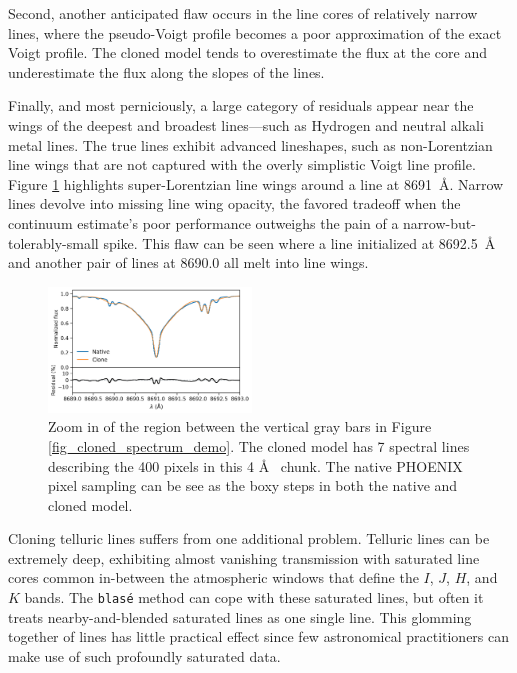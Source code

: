 \documentclass[twocolumn]{aastex631}
\begin{document}
Second, another anticipated flaw occurs in the line cores of relatively narrow lines, where the pseudo-Voigt profile becomes a poor approximation of the exact Voigt profile.  The cloned model tends to overestimate the flux at the core and underestimate the flux along the slopes of the lines.

Finally, and most perniciously, a large category of residuals appear near the wings of the deepest and broadest lines---such as Hydrogen and neutral alkali metal lines.  The true lines exhibit advanced lineshapes, such as non-Lorentzian line wings that are not captured with the overly simplistic Voigt line profile.  Figure \ref{fig_zoom_cloning_performance} highlights super-Lorentzian line wings around a line at 8691~\AA.  Narrow lines devolve into missing line wing opacity, the favored tradeoff when the continuum estimate's poor performance outweighs the pain of a narrow-but-tolerably-small spike. This flaw can be seen where a line initialized at 8692.5~\AA~ and another pair of lines at 8690.0 all melt into line wings.

\begin{figure}[hbt!]
    \centering
    \includegraphics[width=0.48\textwidth]{figures/blase_clone_demo_zoom.png}
    \caption{Zoom in of the region between the vertical gray bars in Figure \ref{fig_cloned_spectrum_demo}. The cloned model has 7 spectral lines describing the 400 pixels in this 4 \AA~ chunk.  The native PHOENIX pixel sampling can be see as the boxy steps in both the native and cloned model.  }
    \label{fig_zoom_cloning_performance}
\end{figure}

Cloning telluric lines suffers from one additional problem.  Telluric lines can be extremely deep, exhibiting almost vanishing transmission with saturated line cores common in-between the atmospheric windows that define the $I$, $J$, $H$, and $K$ bands.  The \texttt{blas\'e} method can cope with these saturated lines, but often it treats nearby-and-blended saturated lines as one single line.  This glomming together of lines has little practical effect since few astronomical practitioners can make use of such profoundly saturated data.
\end{document}
